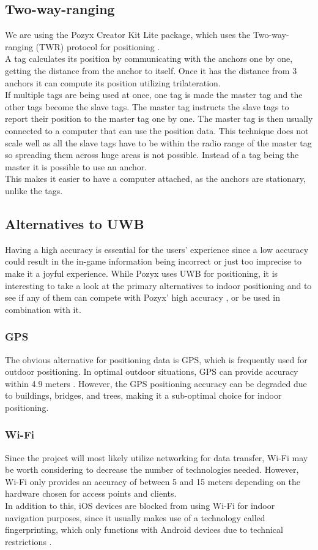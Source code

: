 \subsection{Two-way-ranging} \label{pozyx:TWR}
We are using the Pozyx Creator Kit Lite package, which uses the Two-way-ranging (TWR) protocol for positioning \cite{pozyx-Positioning}.\\
A tag calculates its position by communicating with the anchors one by one, getting the distance from the anchor to itself.
Once it has the distance from 3 anchors it can compute its position utilizing trilateration.
\\
If multiple tags are being used at once, one tag is made the master tag and the other tags become the slave tags.
The master tag instructs the slave tags to report their position to the master tag one by one.
The master tag is then usually connected to a computer that can use the position data.
This technique does not scale well as all the slave tags have to be within the radio range of the master tag so spreading them across huge areas is not possible.
Instead of a tag being the master it is possible to use an anchor.\\
This makes it easier to have a computer attached, as the anchors are stationary, unlike the tags.

\subsection{Alternatives to UWB}
Having a high accuracy is essential for the users' experience since a low accuracy could result in the in-game information being incorrect or just too imprecise to make it a joyful experience.
While Pozyx uses UWB for positioning, it is interesting to take a look at the primary alternatives to indoor positioning and to see if any of them can compete with Pozyx' high accuracy \cite{pozyx}, or be used in combination with it.

\subsubsection{GPS}
The obvious alternative for positioning data is GPS, which is frequently used for outdoor positioning.
In optimal outdoor situations, GPS can provide accuracy within 4.9 meters \cite{gpsgov:accuracy}.
However, the GPS positioning accuracy can be degraded due to buildings, bridges, and trees, making it a sub-optimal choice for indoor positioning.

\subsubsection{Wi-Fi}
Since the project will most likely utilize networking for data transfer, Wi-Fi may be worth considering to decrease the number of technologies needed.
However, Wi-Fi only provides an accuracy of between 5 and 15 meters depending on the hardware chosen for access points and clients.\\
In addition to this, iOS devices are blocked from using Wi-Fi for indoor navigation purposes, since it usually makes use of a technology called fingerprinting, which only functions with Android devices due to technical restrictions \cite{infsoft:wifi}.

